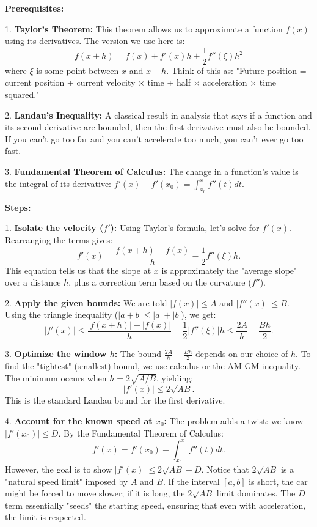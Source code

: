 \begin{solution}
\textbf{Prerequisites:}

1. \textbf{Taylor's Theorem:} This theorem allows us to approximate a function $f(x)$ using its derivatives. The version we use here is:
    \[ f(x+h) = f(x) + f'(x)h + \frac{1}{2} f''(\xi) h^2 \]
    where $\xi$ is some point between $x$ and $x+h$. Think of this as: "Future position = current position + current velocity $\times$ time + half $\times$ acceleration $\times$ time squared."

2. \textbf{Landau's Inequality:} A classical result in analysis that says if a function and its second derivative are bounded, then the first derivative must also be bounded. If you can't go too far and you can't accelerate too much, you can't ever go too fast.

3. \textbf{Fundamental Theorem of Calculus:} The change in a function's value is the integral of its derivative: $f'(x) - f'(x_0) = \int_{x_0}^x f''(t) dt$.


\textbf{Steps:}

1. \textbf{Isolate the velocity ($f'$):}
    Using Taylor's formula, let's solve for $f'(x)$. Rearranging the terms gives:
    \[ f'(x) = \frac{f(x+h) - f(x)}{h} - \frac{1}{2} f''(\xi) h. \]
    This equation tells us that the slope at $x$ is approximately the "average slope" over a distance $h$, plus a correction term based on the curvature ($f''$).

2. \textbf{Apply the given bounds:}
    We are told $|f(x)| \leq A$ and $|f''(x)| \leq B$. Using the triangle inequality ($|a+b| \leq |a| + |b|$), we get:
    \[ |f'(x)| \leq \frac{|f(x+h)| + |f(x)|}{h} + \frac{1}{2} |f''(\xi)| h \leq \frac{2A}{h} + \frac{Bh}{2}. \]

3. \textbf{Optimize the window $h$:}
    The bound $\frac{2A}{h} + \frac{Bh}{2}$ depends on our choice of $h$. To find the "tightest" (smallest) bound, we use calculus or the AM-GM inequality. The minimum occurs when $h = 2\sqrt{A/B}$, yielding:
    \[ |f'(x)| \leq 2\sqrt{AB}. \]
    This is the standard Landau bound for the first derivative.

4. \textbf{Account for the known speed at $x_0$:}
    The problem adds a twist: we know $|f'(x_0)| \leq D$. By the Fundamental Theorem of Calculus:
    \[ f'(x) = f'(x_0) + \int_{x_0}^x f''(t) dt. \]
    However, the goal is to show $|f'(x)| \leq 2\sqrt{AB} + D$. Notice that $2\sqrt{AB}$ is a "natural speed limit" imposed by $A$ and $B$. If the interval $[a, b]$ is short, the car might be forced to move slower; if it is long, the $2\sqrt{AB}$ limit dominates. The $D$ term essentially "seeds" the starting speed, ensuring that even with acceleration, the limit is respected.



\end{solution}
